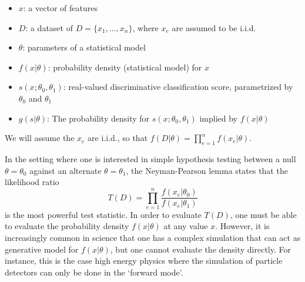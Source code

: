 \documentclass[11pt, oneside]{article}   	%
\begin{document}
\begin{itemize}
 \item $x$: a vector of features
 \item $D$: a dataset of $D=\{x_1, \dots, x_n\}$, where $x_e$ are assumed to be i.i.d.
 \item $\theta$: parameters of a statistical model
\item $f(x| \theta)$:  probability density  (statistical model) for $x$ 
\item $s(x;\theta_0, \theta_1)$: real-valued discriminative classification score, parametrized by $\theta_0$ and $\theta_1$
\item $g( s | \theta )$: The probability density  for $s(x; \theta_0, \theta_1)$ implied by $f(x|\theta)$ \end{itemize}
We will assume the $x_e$ are i.i.d., so that $f(D|\theta) = \prod_{e=1}^n f(x_e | \theta)$.

In the setting where one is interested in simple hypothesis testing between a null $\theta=\theta_0$ against an alternate $\theta=\theta_1$, the Neyman-Pearson lemma states that the likelihood ratio 
\begin{equation}
T(D) = \prod_{e=1}^n \frac{ f(x_e|\theta_0)}{ f(x_e|\theta_1)}
\end{equation}
is the most powerful test statistic. In order to evaluate $T(D)$, one must be able to evaluate the probability density 
$f(x| \theta)$ at any value $x$. However, it is increasingly common in science that one has a complex simulation that 
can act as generative model  for $f(x|\theta)$, but one cannot evaluate the density directly. For instance, this is the case 
high energy physics where the simulation of particle detectors can only be done in the `forward mode'. 
\end{document}

